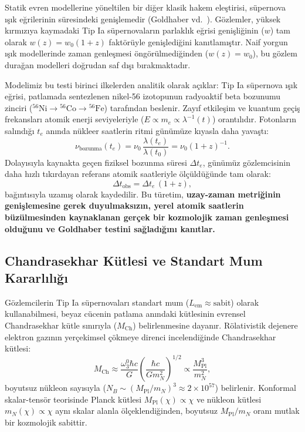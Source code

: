 \documentclass[11pt,a4paper]{article}
\begin{document}
Statik evren modellerine yöneltilen bir diğer klasik hakem eleştirisi, süpernova ışık eğrilerinin süresindeki genişlemedir (Goldhaber vd.~\cite{goldhaber2001}). Gözlemler, yüksek kırmızıya kaymadaki Tip Ia süpernovaların parlaklık eğrisi genişliğinin ($w$) tam olarak $w(z) = w_0 (1+z)$ faktörüyle genişlediğini kanıtlamıştır. Naif yorgun ışık modellerinde zaman genleşmesi öngörülmediğinden ($w(z) = w_0$), bu gözlem durağan modelleri doğrudan saf dışı bırakmaktadır.

Modelimiz bu testi birinci ilkelerden analitik olarak açıklar:
Tip Ia süpernova ışık eğrisi, patlamada sentezlenen nikel-56 izotopunun radyoaktif beta bozunumu zinciri ($^{56}\mathrm{Ni} \to {}^{56}\mathrm{Co} \to {}^{56}\mathrm{Fe}$) tarafından beslenir. Zayıf etkileşim ve kuantum geçiş frekansları atomik enerji seviyeleriyle ($E \propto m_e \propto \lambda^{-1}(t)$) orantılıdır. Fotonların salındığı $t_e$ anında nükleer saatlerin ritmi günümüze kıyasla daha yavaştı:
\begin{equation}
    \nu_{\mathrm{bozunma}}(t_e) = \nu_0 \, \frac{\lambda(t_e)}{\lambda(t_0)} = \nu_0 (1+z)^{-1}.
\end{equation}
Dolayısıyla kaynakta geçen fiziksel bozunma süresi $\Delta t_e$, günümüz gözlemcisinin daha hızlı tıkırdayan referans atomik saatleriyle ölçüldüğünde tam olarak:
\begin{equation}
    \Delta t_{\mathrm{obs}} = \Delta t_e \, (1 + z),
    \label{eq:goldhaber_ispat}
\end{equation}
bağıntısıyla uzamış olarak kaydedilir. Bu türetim, \textbf{uzay-zaman metriğinin genişlemesine gerek duyulmaksızın, yerel atomik saatlerin büzülmesinden kaynaklanan gerçek bir kozmolojik zaman genleşmesi olduğunu ve Goldhaber testini sağladığını kanıtlar.}

\subsection{Chandrasekhar Kütlesi ve Standart Mum Kararlılığı}
Gözlemcilerin Tip Ia süpernovaları standart mum ($L_{\mathrm{em}} \approx \text{sabit}$) olarak kullanabilmesi, beyaz cücenin patlama anındaki kütlesinin evrensel Chandrasekhar kütle sınırıyla ($M_{\mathrm{Ch}}$) belirlenmesine dayanır. Rölativistik dejenere elektron gazının yerçekimsel çökmeye direnci incelendiğinde Chandrasekhar kütlesi:
\begin{equation}
    M_{\mathrm{Ch}} \approx \frac{\omega_3^0 \hbar c}{G} \left( \frac{\hbar c}{G m_N^2} \right)^{1/2} \propto \frac{M_{\mathrm{Pl}}^3}{m_N^2},
    \label{eq:chandrasekhar_tanim}
\end{equation}
boyutsuz nükleon sayısıyla ($N_B \sim (M_{\mathrm{Pl}}/m_N)^3 \approx 2 \times 10^{57}$) belirlenir. Konformal skalar-tensör teorisinde Planck kütlesi $M_{\mathrm{Pl}}(\chi) \propto \chi$ ve nükleon kütlesi $m_N(\chi) \propto \chi$ aynı skalar alanla ölçeklendiğinden, boyutsuz $M_{\mathrm{Pl}} / m_N$ oranı mutlak bir kozmolojik sabittir. 
\end{document}
